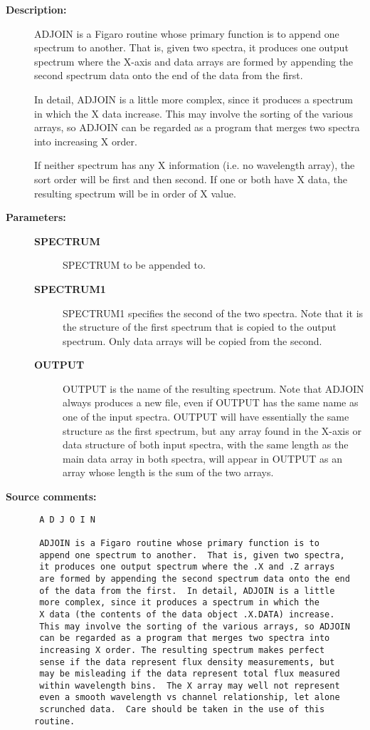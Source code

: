 \begin{description}

\item [{\bf Description:}]
 ADJOIN is a Figaro routine whose primary function is to append one
 spectrum to another.  That is, given two spectra, it produces one
 output spectrum where the X-axis and data arrays are formed by
 appending the second spectrum data onto the end of the data from the
 first.

 In detail, ADJOIN is a little more complex, since it produces a
 spectrum in which the X data increase.  This may involve the sorting
 of the various arrays, so ADJOIN can be regarded as a program that
 merges two spectra into increasing X order.

 If neither spectrum has any X information (i.e. no wavelength array),
 the sort order will be first and then second.  If one or both have
 X data, the resulting spectrum will be in order of X value.

\item [{\bf Parameters:}]
\begin{description}
\item [{\bf SPECTRUM}]
 SPECTRUM to be appended to.
\item [{\bf SPECTRUM1}]
 SPECTRUM1 specifies the second of the two spectra.
 Note that it is the structure of the first spectrum
 that is copied to the output spectrum.  Only data
 arrays will be copied from the second.
\item [{\bf OUTPUT}]
 OUTPUT is the name of the resulting spectrum.  Note
 that ADJOIN always produces a new file, even if OUTPUT
 has the same name as one of the input spectra.  OUTPUT
 will have essentially the same structure as the first
 spectrum, but any array found in the X-axis or data
 structure of both input spectra, with the same length
 as the main data array in both spectra, will appear in
 OUTPUT as an array whose length is the sum of the two
 arrays.
\end{description}

\item [{\bf Source comments:}]
\begin{verbatim}
 A D J O I N

 ADJOIN is a Figaro routine whose primary function is to
 append one spectrum to another.  That is, given two spectra,
 it produces one output spectrum where the .X and .Z arrays
 are formed by appending the second spectrum data onto the end
 of the data from the first.  In detail, ADJOIN is a little
 more complex, since it produces a spectrum in which the
 X data (the contents of the data object .X.DATA) increase.
 This may involve the sorting of the various arrays, so ADJOIN
 can be regarded as a program that merges two spectra into
 increasing X order. The resulting spectrum makes perfect
 sense if the data represent flux density measurements, but
 may be misleading if the data represent total flux measured
 within wavelength bins.  The X array may well not represent
 even a smooth wavelength vs channel relationship, let alone
 scrunched data.  Care should be taken in the use of this routine.


\end{verbatim}
\end{description}
